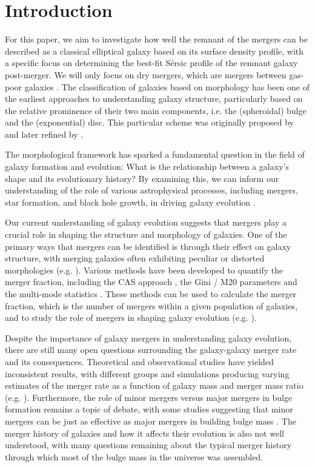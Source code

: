 \documentclass[linenumbers,trackchanges]{aastex7}
\begin{document}
\section{Introduction}
For this paper, we aim to investigate how well the remnant of the mergers can be described as a classical elliptical galaxy based on its surface density profile, with a specific focus on determining the best-fit Sérsic profile of the remnant galaxy post-merger. We will only focus on dry mergers, which are mergers between gas-poor galaxies \citep{lin_redshift_2008}. The classification of galaxies based on morphology has been one of the earliest approaches to understanding galaxy structure, particularly based on the relative prominence of their two main components, i.e. the (spheroidal) bulge and the (exponential) disc. This particular scheme was originally proposed by \cite{hubble_extragalactic_1926} and later refined by \cite{flugge_classification_1959}. 

The morphological framework has sparked a fundamental question in the field of galaxy formation and evolution: What is the relationship between a galaxy's shape and its evolutionary history?
By examining this, we can inform our understanding of the role of various astrophysical processes, including mergers, star formation, and black hole growth, in driving galaxy evolution \citep{barnes_dynamics_1992}. 


Our current understanding of galaxy evolution suggests that mergers play a crucial role in shaping the structure and morphology of galaxies. One of the primary ways that mergers can be identified is through their effect on galaxy structure, with merging galaxies often exhibiting peculiar or distorted morphologies (e.g. \cite{toomre_galactic_1972, conselice_symmetry_1997}). Various methods have been developed to quantify the merger fraction, including the CAS approach \citep{conselice_relationship_2003}, the Gini / M20 parameters \citep{lotz_new_2004} and the multi-mode statistics \citep{freeman_new_2013}. These methods can be used to calculate the merger fraction, which is the number of mergers within a given population of galaxies, and to study the role of mergers in shaping galaxy evolution (e.g. \cite{de_propris_millennium_2007}). 

Despite the importance of galaxy mergers in understanding galaxy evolution, there are still many open questions surrounding the galaxy-galaxy merger rate and its consequences. Theoretical and observational studies have yielded inconsistent results, with different groups and simulations producing varying estimates of the merger rate as a function of galaxy mass and merger mass ratio (e.g. \cite{gottlober_merging_2001, weinzirl_bulge_2008}). Furthermore, the role of minor mergers versus major mergers in bulge formation remains a topic of debate, with some studies suggesting that minor mergers can be just as effective as major mergers in building bulge mass \citep{cox_effect_2008}. The merger history of galaxies and how it affects their evolution is also not well understood, with many questions remaining about the typical merger history through which most of the bulge mass in the universe was assembled. 
\end{document}
